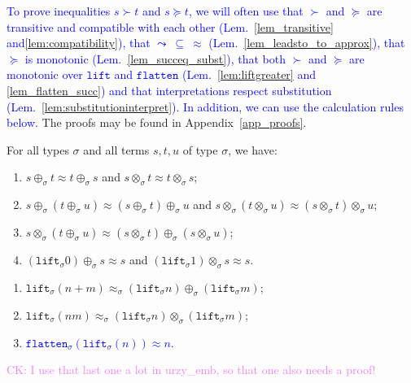 \documentclass[a4paper,UKenglish,cleveref,autoref,numberwithinsect]{lipics-v2019}
\theoremstyle{definition}
\newcommand{\arrW}{\leadsto}
\newcommand{\flatten}{\mathtt{flatten}}
\newcommand{\lift}{\mathtt{lift}}
\newcommand{\CK}[1]{\textcolor{violet}{CK: #1}}
\newcommand{\CKchange}[1]{\textcolor{blue}{#1}}
\begin{document}
\CKchange{To prove inequalities $s \succ t$ and $s \succeq t$, we will often
use that $\succ$ and $\succeq$ are transitive and compatible with each
other (Lem.~\ref{lem_transitive} and\ref{lem:compatibility}), that
$\arrW\:\subseteq\:\approx$ (Lem.~\ref{lem_leadsto_to_approx}),
that $\succeq$ is monotonic (Lem.~\ref{lem_succeq_subst}),
that both $\succ$ and $\succeq$ are monotonic over $\lift$ and $\flatten$
(Lem.~\ref{lem:liftgreater} and \ref{lem_flatten_succ}) and that
interpretations respect substitution
(Lem.~\ref{lem:substitutioninterpret}).  In addition, we can use the
calculation rules below.}  The proofs may be found in
Appendix~\ref{app_proofs}.

\begin{lemma}\label{lem:approxproperties}
For all types $\sigma$ and all terms $s,t,u$ of type $\sigma$, we
have:
\begin{enumerate}
\item\label{lem:approx:symmetry} $s \oplus_\sigma t \approx t
  \oplus_\sigma s$ and $s \otimes_\sigma t \approx t \otimes_\sigma
  s$;
\item\label{lem:approx:assoc} $s \oplus_\sigma (t \oplus_\sigma u)
  \approx (s \oplus_\sigma t) \oplus_\sigma u$ and $s \otimes_\sigma
  (t \otimes_\sigma u) \approx (s \otimes_\sigma t) \otimes_\sigma u$;
\item\label{lem:approx:distribution} $s \otimes_\sigma (t
  \oplus_\sigma u) \approx (s \otimes_\sigma t) \oplus_\sigma (s
  \otimes_\sigma u)$;
\item\label{lem:approx:neutral} $(\lift_\sigma 0) \oplus_\sigma s
  \approx s$ and $(\lift_\sigma 1) \otimes_\sigma s \approx s$.
\end{enumerate}
\end{lemma}

\begin{lemma}\label{lem_lift_approx}
  \begin{enumerate}
  \item\label{lem_lift_approx:plussplit}
    $\lift_\sigma(n+m) \approx_\sigma (\lift_\sigma n)
    \oplus_\sigma (\lift_\sigma m)$;
  \item $\lift_\sigma(n m) \approx_\sigma (\lift_\sigma n)
    \otimes_\sigma (\lift_\sigma m)$;
  \item \CKchange{$\flatten_\sigma(\lift_\sigma(n)) \approx n$.}
  \end{enumerate}
\end{lemma}

\CK{I use that last one a lot in urzy\_emb, so that one also needs a
proof!}
\end{document}
